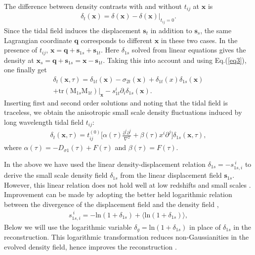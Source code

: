 \documentclass[aps,prd,twocolumn,showpacs,superscriptaddress,groupedaddress,nofootinbib]{revtex4}  %
\newcommand{\mr}{\mathrm}
\newcommand{\mb}{\mathbf}
\begin{document}
The difference between density contrasts with and without $t_{ij}$ at $\bm{x}$ 
is 
\begin{eqnarray}
\delta_{t}(\bm{x})=\delta(\bm{x})-\delta(\bm{x})|_{t_{ij}=0}.
\end{eqnarray}
Since the tidal field induces the displacement $\mb{s}_{t}$ 
in addition to $\mb{s}_{s}$, the same Lagrangian coordinate $\bm{q}$ corresponds
to different $\bm{x}$ in these two cases. In the presence of $t_{ij}$, 
$\bm{x}=\bm{q}+\mb{s}_{1s}+\mb{s}_{1t}$. Here $\delta_{1s}$ solved from
linear equations gives the density at 
$\bm{x}_s=\bm{q}+\mb{s}_{1s}=\bm{x}-\mb{s}_{1t}$.
Taking this into account and using Eq.(\ref{eq3}), one finally get 
\begin{eqnarray}
\delta_t(\bm{x},\tau)=\delta_{1t}(\bm{x})-\sigma_{2t}(\bm{x})+
\delta_{1t}(x)\delta_{1s}(\bm{x}) \nonumber \\
+\mr{tr}(\mr{M}_{1s}\mr{M}_{1t})|_{\bm{x}}
-s^i_{1t}\partial_i \delta_{1s}(\bm{x}).
\end{eqnarray}
Inserting first and second order solutions and noting that the tidal field
is traceless, we obtain the anisotropic small scale
density fluctuations induced by  long wavelength tidal field $t_{ij}$:
\begin{eqnarray}
\label{eq22}
\delta_t(\bm{x},\tau)=t^{(0)}_{ij}\bigg[
\alpha(\tau)\frac{\partial^i\partial^j}{\nabla^2}+\beta(\tau)x^i\partial^j
\bigg]\delta_{1s}(\bm{x},\tau),
\end{eqnarray}
where $\alpha(\tau)=-D_{\sigma1}(\tau)+F(\tau)$ and $\beta(\tau)=F(\tau)$.

In the above we have used the linear density-displacement relation 
$\delta_{1s}=-s_{1s,i}^{\ i}$  to derive the small scale density field $\delta_{1s}$ 
from the linear displacement field $\bm{s}_{1s}$. However,
this linear relation does not hold well at low redshifts and small scales
\cite{2012:log}. Improvement can be made by adopting the better held 
logarithmic relation between the divergence
of the displacement field and the density field  \cite{2012:log},
\begin{eqnarray}
s_{1s,i}^{\ i} = -\mr{ln}(1+\delta_{1s})+\langle\mr{ln}(1+\delta_{1s})\rangle,
\end{eqnarray}
Below we will use the logarithmic variable $\delta_g=\mr{ln}(1+\delta_{1s})$ in 
place of $\delta_{1s}$ in the reconstruction. This
logarithmic transformation reduces non-Gaussianities in the evolved density field, hence 
improves the reconstruction \cite{2012:pen}. 
\end{document}
